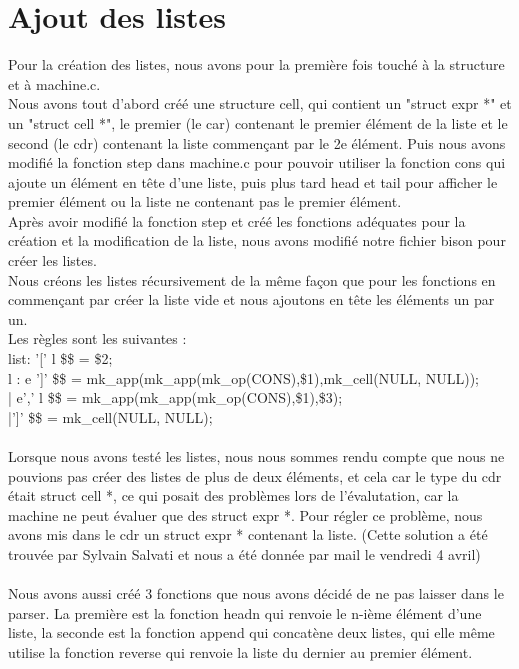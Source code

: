\documentclass{report}
\begin{document}
\part{Ajout des listes}
Pour la création des listes, nous avons pour la première fois touché à la structure et à machine.c.\\
Nous avons tout d'abord créé une structure cell, qui contient un "struct expr *" et un "struct cell *", le premier (le car) contenant le premier élément de la liste et le second (le cdr) contenant la liste commençant par le 2e élément. Puis nous avons modifié la fonction step dans machine.c pour pouvoir utiliser la fonction cons qui ajoute un élément en tête d'une liste, puis plus tard head et tail pour afficher le premier élément ou la liste ne contenant pas le premier élément.\\
Après avoir modifié la fonction step et créé les fonctions adéquates pour la création et la modification de la liste, nous avons modifié notre fichier bison pour créer les listes.\\
Nous créons les listes récursivement de la même façon que pour les fonctions en commençant par créer la liste vide et nous ajoutons en tête les éléments un par un.\\
Les règles sont les suivantes :\\
list: '[' l {\$\$ = \$2;}\\
l : e ']'   {\$\$ = mk\_app(mk_app(mk_op(CONS),\$1),mk_cell(NULL, NULL));}\\
| e',' l    {\$\$ = mk\_app(mk_app(mk_op(CONS),\$1),\$3);}\\
|']'        {\$\$ = mk\_cell(NULL, NULL);}\\
\\
Lorsque nous avons testé les listes, nous nous sommes rendu compte que nous ne pouvions pas créer des listes de plus de deux éléments, et cela car le type du cdr était struct cell *, ce qui posait des problèmes lors de l'évalutation, car la machine ne peut évaluer que des struct expr *. Pour régler ce problème, nous avons mis dans le cdr un struct expr * contenant la liste. (Cette solution a été trouvée par Sylvain Salvati et nous a été donnée par mail le vendredi 4 avril)\\
\\
Nous avons aussi créé 3 fonctions que nous avons décidé de ne pas laisser dans le parser. La première est la fonction headn qui renvoie le n-ième élément d'une liste, la seconde est la fonction append qui concatène deux listes, qui elle même utilise la fonction reverse qui renvoie la liste du dernier au premier élément.
\end{document}
